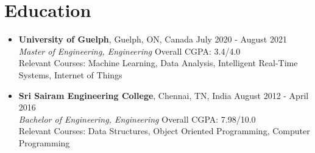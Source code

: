 \documentclass{article}
\begin{document}
	\section*{Education \hrulefill\vspace{-.3\baselineskip}}
	\begin{itemize}
		\item \textbf{University of Guelph}, Guelph, ON, Canada \hfill July 2020 - August 2021\\
			  \textit{Master of Engineering, Engineering} \hfill	Overall CGPA: 3.4/4.0\\
			  Relevant Courses: Machine Learning, Data Analysis, Intelligent Real-Time Systems, Internet of Things
		\item \textbf{Sri Sairam Engineering College}, Chennai, TN, India \hfill August 2012 - April 2016\\
	\textit{Bachelor of Engineering, Engineering} \hfill	Overall CGPA: 7.98/10.0\\
Relevant Courses: Data Structures, Object Oriented Programming, Computer Programming
	\end{itemize}
	
\end{document}
